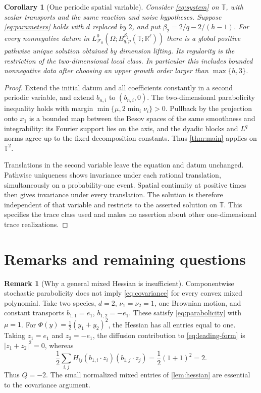 \documentclass[11pt]{amsart}
\newtheorem{corollary}[theorem]{Corollary}
\theoremstyle{definition}
\newtheorem{remark}[theorem]{Remark}
\newcommand{\T}{\mathbb T}
\newcommand{\R}{\mathbb R}
\newcommand{\F}{\mathcal F}
\numberwithin{equation}{section}
\begin{document}
\begin{corollary}[One periodic spatial variable]\label{cor:one-dimensional}
Consider \eqref{eq:system} on $\T$, with scalar transports and the
same reaction and noise hypotheses. Suppose
\eqref{eq:parameters} holds with $d$ replaced by $2$, and put
$\beta_2=2/q-2/(h-1)$. For every nonnegative datum in
$L^0_{\F_0}(\Omega;B^{\beta_2}_{q,p}(\T;\R^\ell))$ there is a global
positive pathwise unique solution obtained by dimension lifting.
Its regularity is the restriction of the two-dimensional local class.
In particular this includes bounded nonnegative data after choosing
an upper growth order larger than $\max\{h,3\}$.
\end{corollary}
\begin{proof}
Extend the initial datum and all coefficients constantly in a second
periodic variable, and extend $b_{n,i}$ to $(b_{n,i},0)$. The
two-dimensional parabolicity inequality holds with margin
$\min\{\mu,2\min_i\nu_i\}>0$. Pullback by the projection onto $x_1$ is a
bounded map between the Besov spaces of the same smoothness and
integrability: its Fourier support lies on the axis, and the dyadic
blocks and $L^q$ norms agree up to the fixed decomposition constants.
Thus \cref{thm:main} applies on $\T^2$.

Translations in the second variable leave the equation and datum
unchanged. Pathwise uniqueness shows invariance under each rational
translation, simultaneously on a probability-one event. Spatial
continuity at positive times then gives invariance under every
translation. The solution is therefore independent of that variable
and restricts to the asserted solution on $\T$. This specifies the
trace class used and makes no assertion about other one-dimensional
trace realizations.
\end{proof}

\section{Remarks and remaining questions}

\begin{remark}[Why a general mixed Hessian is insufficient]\label{rem:hessian}
Componentwise stochastic parabolicity does not imply
\eqref{eq:covariance} for every convex mixed polynomial. Take two
species, $d=2$, $\nu_1=\nu_2=1$, one Brownian motion, and constant
transports $b_{1,1}=e_1$, $b_{1,2}=-e_1$. These satisfy
\eqref{eq:parabolicity} with $\mu=1$. For
$\Phi(y)=\tfrac12(y_1+y_2)^2$, the Hessian has all entries equal
to one. Taking $z_1=e_1$ and $z_2=-e_1$, the diffusion contribution
to \eqref{eq:leading-form} is $|z_1+z_2|^2=0$, whereas
\[
\frac12\sum_{i,j}H_{ij}
 (b_{1,i}\cdot z_i)(b_{1,j}\cdot z_j)=\frac12(1+1)^2=2.
\]
Thus $Q=-2$. The small normalized mixed entries of
\cref{lem:hessian} are essential to the covariance argument.
\end{remark}
\end{document}
